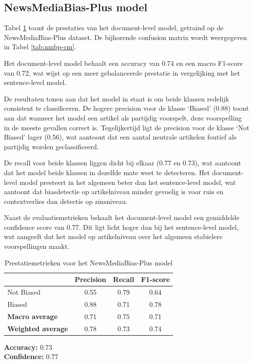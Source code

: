 \subsection{NewsMediaBias-Plus model}

Tabel \ref{tab:nmbp-metrics} toont de prestaties van het document-level model, getraind op de News\-MediaBias-Plus dataset. De bijhorende confusion matrix wordt weergegeven in Tabel \ref{tab:nmbp-cm}.

Het document-level model behaalt een accuracy van 0.74 en een macro F1-score van 0.72, wat wijst op een meer gebalanceerde prestatie in vergelijking met het sentence-level model.

De resultaten tonen aan dat het model in staat is om beide klassen redelijk consistent te classificeren. De hogere precision voor de klasse `Biased' (0.88) toont aan dat wanneer het model een artikel als partijdig voorspelt, deze voorspelling in de meeste gevallen correct is. Tegelijkertijd ligt de precision voor de klasse `Not Biased' lager (0.56), wat aantoont dat een aantal neutrale artikelen foutief als partijdig worden geclassificeerd.

De recall voor beide klassen liggen dicht bij elkaar (0.77 en 0.73), wat aantoont dat het model beide klassen in dezelfde mate weet te detecteren. Het document-level model presteert in het algemeen beter dan het sentence-level model, wat aantoont dat  biasdetectie op artikelniveau minder gevoelig is voor ruis en contextverlies dan detectie op zinsniveau.

Naast de evaluatiemetrieken behaalt het document-level model een gemiddelde confidence score van 0.77. Dit ligt licht hoger dan bij het sentence-level model, wat aangeeft dat het model op artikelniveau over het algemeen stabielere voorspellingen maakt.

\begin{table}
    \centering
    \begin{tabular}{lccc}
        & \textbf{Precision} & \textbf{Recall} & \textbf{F1-score} \\
        \hline
        Not Biased & 0.55 & 0.79 & 0.64 \\
        Biased & 0.88 & 0.71 & 0.78 \\
        \hline
        \textbf{Macro average} & 0.71 & 0.75 & 0.71 \\
        \textbf{Weighted average} & 0.78 & 0.73 & 0.74 \\
    \end{tabular}
    \vspace{0.2cm}
    
    \textbf{Accuracy:} 0.73 \\
    \textbf{Confidence:} 0.77 \\
    \caption{Prestatiemetrieken voor het NewsMediaBias-Plus model}
    \label{tab:nmbp-metrics}
\end{table}

